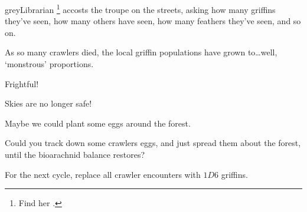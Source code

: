 \Gls{greyLibrarian}%
\footnote{Find her .}
accosts the troupe on the streets, asking how many griffins they've seen, how many others have seen, how many feathers they've seen, and so on.

\begin{speechtext}
  As so many \glspl{crawler} died, the local griffin populations have grown to\ldots well, `monstrous' proportions.

  Frightful!

  Skies are no longer safe!

  Maybe we could plant some eggs around the forest.

  Could you track down some \glspl{crawler} eggs, and just spread them about the forest, until the bioarachnid balance restores?
\end{speechtext}

For the next \gls{cycle}, replace all \gls{crawler} encounters with $1D6$ griffins.

